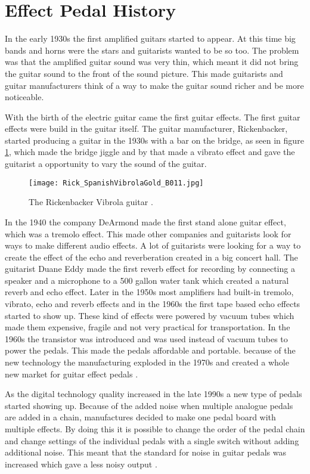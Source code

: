 \section{Effect Pedal History}
\label{sec:problem_analysis}
In the early 1930s the first amplified guitars started to appear. At this time big bands and horns were the stars and guitarists wanted to be so too. The problem was that the amplified guitar sound was very thin, which meant it did not bring the guitar sound to the front of the sound picture. This made guitarists and guitar manufacturers think of a way to make the guitar sound richer and be more noticeable. 

With the birth of the electric guitar came the first guitar effects. The first guitar effects were build in the guitar itself. The guitar manufacturer, Rickenbacker, started producing a guitar in the 1930s with a bar on the bridge, as seen in figure \ref{fig:rickenbacker_vibrola}, which made the bridge jiggle and by that made a vibrato effect and gave the guitarist a opportunity to vary the sound of the guitar.

\begin{figure}[htbp]
\centering
\texttt{[image: Rick\_SpanishVibrolaGold\_B011.jpg]}
\caption{The Rickenbacker Vibrola guitar \citep{rickenbacker_vibrola}.}
\label{fig:rickenbacker_vibrola}
\end{figure}

In the 1940 the company DeArmond made the first stand alone guitar effect, which was a tremolo effect. This made other companies and guitarists look for ways to make different audio effects. A lot of guitarists were looking for a way to create the effect of the echo and reverberation created in a big concert hall. The guitarist Duane Eddy made the first reverb effect for recording by connecting a speaker and a microphone to a 500 gallon water tank which created a natural reverb and echo effect. Later in the 1950s most amplifiers had built-in tremolo, vibrato, echo and reverb effects and in the 1960s the first tape based echo effects started to show up. These kind of effects were powered by vacuum tubes which made them expensive, fragile and not very practical for transportation. In the 1960s the transistor was introduced and was used instead of vacuum tubes to power the pedals. This made the pedals affordable and portable. because of the new technology the manufacturing exploded in the 1970s and created a whole new market for guitar effect pedals \citep{howguitarpedalsworks}.

As the digital technology quality increased in the late 1990s a new type of pedals started showing up. Because of the added noise when multiple analogue pedals are added in a chain, manufactures decided to make one pedal board with multiple effects. By doing this it is possible to change the order of the pedal chain and change settings of the individual pedals with a single switch without adding additional noise. This meant that the standard for noise in guitar pedals was increased which gave a less noisy output \citep{ashorthistoryofeffectpedals}.